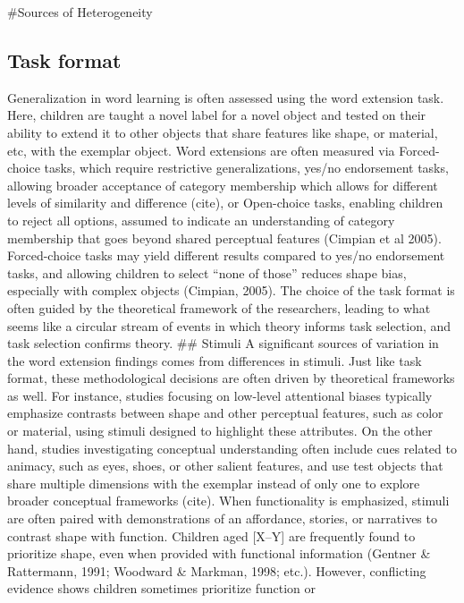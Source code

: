 \documentclass[10pt, letterpaper]{article}
\begin{document}
\#Sources of Heterogeneity

\hypertarget{task-format}{%
\subsection{Task format}\label{task-format}}

Generalization in word learning is often assessed using the word
extension task. Here, children are taught a novel label for a novel
object and tested on their ability to extend it to other objects that
share features like shape, or material, etc, with the exemplar object.
Word extensions are often measured via Forced-choice tasks, which
require restrictive generalizations, yes/no endorsement tasks, allowing
broader acceptance of category membership which allows for different
levels of similarity and difference (cite), or Open-choice tasks,
enabling children to reject all options, assumed to indicate an
understanding of category membership that goes beyond shared perceptual
features (Cimpian et al 2005). Forced-choice tasks may yield different
results compared to yes/no endorsement tasks, and allowing children to
select ``none of those'' reduces shape bias, especially with complex
objects (Cimpian, 2005). The choice of the task format is often guided
by the theoretical framework of the researchers, leading to what seems
like a circular stream of events in which theory informs task selection,
and task selection confirms theory. \#\# Stimuli A significant sources
of variation in the word extension findings comes from differences in
stimuli. Just like task format, these methodological decisions are often
driven by theoretical frameworks as well. For instance, studies focusing
on low-level attentional biases typically emphasize contrasts between
shape and other perceptual features, such as color or material, using
stimuli designed to highlight these attributes. On the other hand,
studies investigating conceptual understanding often include cues
related to animacy, such as eyes, shoes, or other salient features, and
use test objects that share multiple dimensions with the exemplar
instead of only one to explore broader conceptual frameworks (cite).
When functionality is emphasized, stimuli are often paired with
demonstrations of an affordance, stories, or narratives to contrast
shape with function. Children aged {[}X--Y{]} are frequently found to
prioritize shape, even when provided with functional information
(Gentner \& Rattermann, 1991; Woodward \& Markman, 1998; etc.). However,
conflicting evidence shows children sometimes prioritize function or
\end{document}
